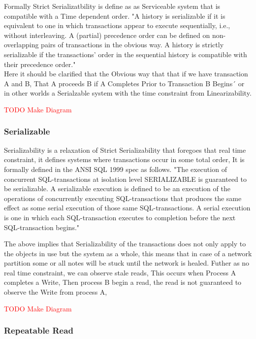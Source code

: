 \documentclass[a4paper,10pt,titlepage]{report}
\begin{document}
Formally Strict Serializatbility is define as as Serviceable system that is compatible with a Time dependent order.
"A history is serializable if it is equivalent to one in which transactions appear to execute sequentially, i.e., without interleaving. A (partial) precedence order can be defined on non-overlapping pairs of transactions in the obvious way. A history is strictly serializable if the transactions’ order in the sequential history is compatible with their precedence order."\cite{10.1145/78969.78972}\\
Here it should be clarified that the Obvious way that that if we have transaction A and B, That A proceeds B if A Completes Prior to Transaction B Begins´ or in other worlds a Serialzable system with the time constraint from Linearizability.

\textcolor{red}{TODO Make Diagram}
\subsubsection{Serializable}

Serializability is a relaxation of Strict Serializability that foregoes that real time constraint, it defines systems where transactions occur in some total order, It is formally defined in the ANSI SQL 1999 spec as follows. "The execution of concurrent SQL-transactions at isolation level SERIALIZABLE is guaranteed to be serializable. A serializable execution is defined to be an execution of the operations of concurrently executing SQL-transactions that produces the same effect as some serial execution of those same SQL-transactions. A serial execution is one in which each SQL-transaction executes to completion before the next SQL-transaction begins."\cite{ansisql1999}\\
\vspace{5mm}

The above implies that Serializability of the transactions does not only apply to the objects in use but the system as a whole, this means that in case of a network partition some or all notes will be stuck until the network is healed. Futher as no real time constraint,  we can observe stale reads, This occurs when Process A completes a Write, Then process B begin a read, the read is not guaranteed to observe the Write from process A, 

\textcolor{red}{TODO Make Diagram}

\subsubsection{Repeatable Read}
\end{document}
